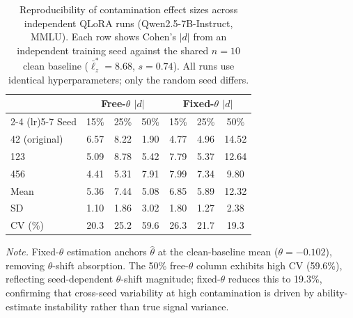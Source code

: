 \begin{table}[ht!]
\centering
\caption{Reproducibility of contamination effect sizes across independent QLoRA runs (Qwen2.5-7B-Instruct, MMLU). Each row shows Cohen's $|d|$ from an independent training seed against the shared $n{=}10$ clean baseline ($\bar{\ell}_z^* = 8.68$, $s = 0.74$). All runs use identical hyperparameters; only the random seed differs.}
\label{tab:qwen_multiseed}
\footnotesize
\begin{tabular}{@{}lcccccc@{}}
\toprule
& \multicolumn{3}{c}{Free-$\theta$ $|d|$} & \multicolumn{3}{c}{Fixed-$\theta$ $|d|$} \\
\cmidrule(lr){2-4} \cmidrule(lr){5-7}
Seed & 15\% & 25\% & 50\% & 15\% & 25\% & 50\% \\
\midrule
42 (original) & 6.57 & 8.22 & 1.90 & 4.77 & 4.96 & 14.52 \\
123 & 5.09 & 8.78 & 5.42 & 7.79 & 5.37 & 12.64 \\
456 & 4.41 & 5.31 & 7.91 & 7.99 & 7.34 & 9.80 \\
\addlinespace
Mean & 5.36 & 7.44 & 5.08 & 6.85 & 5.89 & 12.32 \\
SD & 1.10 & 1.86 & 3.02 & 1.80 & 1.27 & 2.38 \\
CV (\%) & 20.3 & 25.2 & 59.6 & 26.3 & 21.7 & 19.3 \\
\bottomrule
\end{tabular}
\vspace{0.5em}

\noindent\textit{Note.} Fixed-$\theta$ estimation anchors $\hat{\theta}$ at the clean-baseline mean ($\theta{=}{-}0.102$), removing $\theta$-shift absorption. The 50\% free-$\theta$ column exhibits high CV (59.6\%), reflecting seed-dependent $\theta$-shift magnitude; fixed-$\theta$ reduces this to 19.3\%, confirming that cross-seed variability at high contamination is driven by ability-estimate instability rather than true signal variance.
\end{table}

